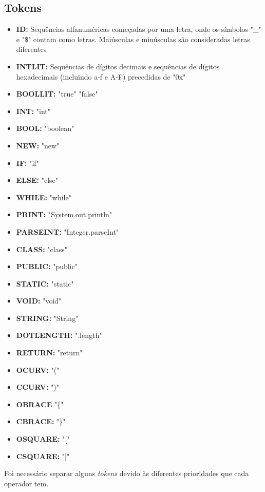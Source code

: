 \documentclass[12pt]{article}
\begin{document}
\subsection{Tokens}
\begin{itemize}
	        \item \textbf{ID:} Sequências alfanuméricas começadas por uma letra, onde os símbolos "\_" e "\$" contam como letras. Maiúsculas e minúsculas são consideradas letras diferentes 
	        \item \textbf{INTLIT:} Sequências de dígitos decimais e sequências de dígitos hexadecimais (incluindo a-f e A-F) precedidas de "0x"
	        \item \textbf{BOOLLIT:} "true" \text{\textbar} "false" 
	        \item \textbf{INT:} "int"
	        \item \textbf{BOOL:} "boolean"
	        \item \textbf{NEW:} "new"
	        \item \textbf{IF:} "if"
	        \item \textbf{ELSE:} "else"
	        \item \textbf{WHILE:} "while"
	        \item \textbf{PRINT:} "System.out.println"
	        \item \textbf{PARSEINT:} "Integer.parseInt"
	        \item \textbf{CLASS:} "class"
	        \item \textbf{PUBLIC:} "public"
	        \item \textbf{STATIC:} "static"
	        \item \textbf{VOID:} "void"
	        \item \textbf{STRING:} "String"
	        \item \textbf{DOTLENGTH:} ".length"
	        \item \textbf{RETURN:} "return"
	        \item \textbf{OCURV:} "("
	        \item \textbf{CCURV:} ")"
	        \item \textbf{OBRACE} "\{"
	        \item \textbf{CBRACE:} "\}"
	        \item \textbf{OSQUARE:} "["
	        \item \textbf{CSQUARE:} "]"	 
	      \end{itemize}
	      \pagebreak
	    Foi necessário separar alguns \emph{tokens} devido às diferentes prioridades que cada operador tem.
\end{document}
